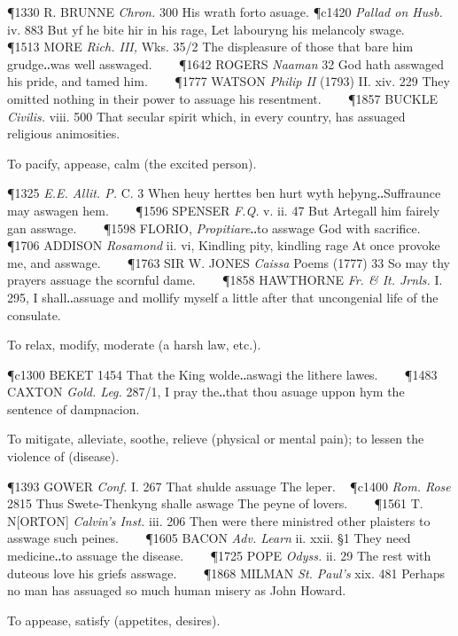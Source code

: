 \begin{description}[wide, labelwidth=!, labelindent=0pt]
\begin{myenumerate}
\P 1330 R. BRUNNE  \textit{Chron.} 300 His wrath forto asuage.
\P c1420 \textit{Pallad  on Husb.} iv. 883 But yf he bite hir in his rage, Let labouryng his melancoly swage.    
\P 1513 MORE  \textit{Rich. III,} Wks. 35/2 The displeasure of those that bare him grudge‥was well asswaged.    
\P 1642 ROGERS  \textit{Naaman} 32 God hath asswaged his pride, and tamed him.    
\P 1777 WATSON  \textit{Philip II} (1793) II. xiv. 229 They omitted nothing in their power to assuage his resentment.    
\P 1857 BUCKLE  \textit{Civilis.} viii. 500 That secular spirit which, in every country, has assuaged religious animosities.

 To pacify, appease, calm (the excited person).

\P 1325 \textit{E.E. Allit. P.} C. 3 When heuy herttes ben hurt wyth heþyng‥Suffraunce may aswagen hem.    
\P 1596 SPENSER  \textit{F.Q.} v. ii. 47 But Artegall him fairely gan asswage.    
\P 1598 FLORIO,  \textit{Propitiare}‥to asswage God with sacrifice.    
\P 1706 ADDISON  \textit{Rosamond} ii. vi, Kindling pity, kindling rage At once provoke me, and asswage.    
\P 1763 SIR W. JONES  \textit{Caissa} Poems (1777) 33 So may thy prayers assuage the scornful dame.    
\P 1858 HAWTHORNE  \textit{Fr. \& It. Jrnls.} I. 295, I shall‥assuage and mollify myself a little after that uncongenial life of the consulate.

 To relax, modify, moderate (a harsh law, etc.).

\P c1300 BEKET 1454 That the King wolde‥aswagi the lithere lawes.    
\P 1483 CAXTON  \textit{Gold. Leg.} 287/1, I pray the‥that thou asuage uppon hym the sentence of dampnacion.

 To mitigate, alleviate, soothe, relieve (physical or mental pain); to lessen the violence of (disease).

\P 1393 GOWER  \textit{Conf.} I. 267 That shulde assuage The leper.  
\P c1400 \textit{Rom. Rose} 2815 Thus Swete-Thenkyng shalle aswage The peyne of lovers.    
\P 1561 T. N[ORTON]  \textit{Calvin's Inst.} iii. 206 Then were there ministred other plaisters to asswage such peines.    
\P 1605 BACON  \textit{Adv. Learn} ii. xxii. §1 They need medicine‥to assuage the disease.    
\P 1725 POPE  \textit{Odyss.} ii. 29 The rest with duteous love his griefs asswage.    
\P 1868 MILMAN  \textit{St. Paul's} xix. 481 Perhaps no man has assuaged so much human misery as John Howard.

 To appease, satisfy (appetites, desires).


\end{myenumerate}
\end{description}
